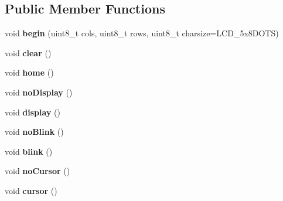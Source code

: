 \subsection*{Public Member Functions}
\begin{DoxyCompactItemize}
\item 
\mbox{\label{classAdafruit__RGBLCDShield_a66d7b674675ee94e27c1da22408bb110}} 
void {\bfseries begin} (uint8\+\_\+t cols, uint8\+\_\+t rows, uint8\+\_\+t charsize=L\+C\+D\+\_\+5x8\+D\+O\+TS)
\item 
\mbox{\label{classAdafruit__RGBLCDShield_ad203e22075b6a8b63e9e206105bcc433}} 
void {\bfseries clear} ()
\item 
\mbox{\label{classAdafruit__RGBLCDShield_a891869292cf384f7edb2c4b7ec17c949}} 
void {\bfseries home} ()
\item 
\mbox{\label{classAdafruit__RGBLCDShield_a9217b8b2d85e14e01210e281f52693f0}} 
void {\bfseries no\+Display} ()
\item 
\mbox{\label{classAdafruit__RGBLCDShield_aa721251c365c8033ac872c18ad64b93f}} 
void {\bfseries display} ()
\item 
\mbox{\label{classAdafruit__RGBLCDShield_a493eacb69308fba363c81d0036e413ea}} 
void {\bfseries no\+Blink} ()
\item 
\mbox{\label{classAdafruit__RGBLCDShield_a5a9697632b6ded2d3d76cf903f9fd3a9}} 
void {\bfseries blink} ()
\item 
\mbox{\label{classAdafruit__RGBLCDShield_a50826483484df49caee7c7851310d802}} 
void {\bfseries no\+Cursor} ()
\item 
\mbox{\label{classAdafruit__RGBLCDShield_a3b041610ba67c0c0e343a7b18b6e668e}} 
void {\bfseries cursor} ()
\item 
\mbox{\label{classAdafruit__RGBLCDShield_ac3383b76397c5cd24cd62a5a67acb074}} 

\end{DoxyCompactItemize}
